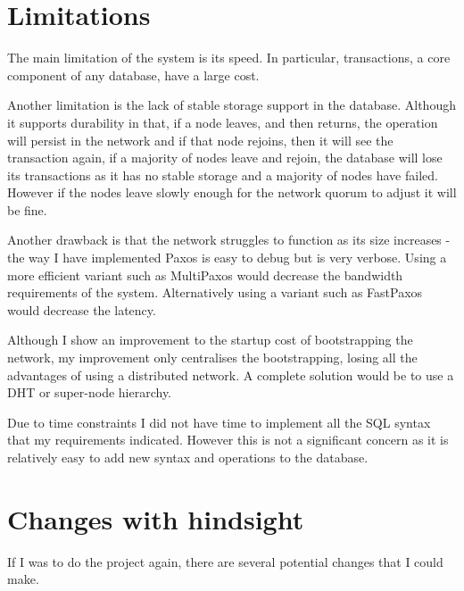 \documentclass[12pt,twoside,notitlepage]{report}
\begin{document}
\section{Limitations}

The main limitation of the system is its speed. In particular, transactions, a core component of
any database, have a large cost.

Another limitation is the lack of stable storage support in the database. Although it supports
durability in that, if a node leaves, and then returns, the operation will persist in the network
and if that node rejoins, then it will see the transaction again, if a majority of nodes leave and
rejoin, the database will lose its transactions as it has no stable storage and a majority of
nodes have failed. However if the nodes leave slowly enough for the network quorum to adjust it
will be fine.

Another drawback is that the network struggles to function as its size increases - the way I have
implemented Paxos is easy to debug but is very verbose. Using a more efficient variant such as
MultiPaxos would decrease the bandwidth requirements of the system. Alternatively using a variant
such as FastPaxos would decrease the latency.

Although I show an improvement to the startup cost of bootstrapping the network, my improvement
only centralises the bootstrapping, losing all the advantages of using a distributed network. A
complete solution would be to use a DHT or super-node hierarchy.

Due to time constraints I did not have time to implement all the SQL syntax that my requirements
indicated. However this is not a significant concern as it is relatively easy to add new syntax and
operations to the database.

\section{Changes with hindsight}

If I was to do the project again, there are several potential changes that I could make.

\end{document}
